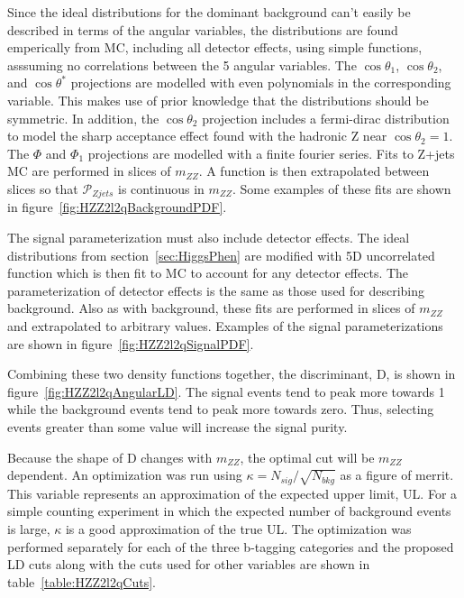 Since the ideal distributions for the dominant background 
can't easily be described in terms of the angular variables, 
the distributions are found 
emperically from MC, including all detector effects, 
using simple functions, asssuming no correlations between 
the 5 angular variables.  The $\cos\theta_1$, $\cos\theta_2$, 
and $\cos\theta^*$ projections are modelled with even polynomials
in the corresponding variable.  This makes use of prior knowledge
that the distributions should be symmetric.  In addition, 
the $\cos\theta_2$ projection includes a fermi-dirac distribution
to model the sharp acceptance effect found with the hadronic
Z near $\cos\theta_2=1$.  The $\Phi$ and $\Phi_1$ projections 
are modelled with a finite fourier series.
Fits to Z+jets MC are performed in slices of $m_{ZZ}$.  A function
is then extrapolated between slices so that $\mathscr{P}_{Zjets}$ 
is continuous in $m_{ZZ}$.  Some examples of these fits are shown
in figure~\ref{fig:HZZ2l2qBackgroundPDF}.  

The signal parameterization must also include detector effects.
The ideal distributions from section~\ref{sec:HiggsPhen} are 
modified with 5D uncorrelated function which is then fit to 
MC to account for any detector effects.  The parameterization 
of detector effects is the same as those used for describing background.
Also as with background, 
these fits are performed in slices of $m_{ZZ}$ and extrapolated
to arbitrary values.  Examples of the signal parameterizations
are shown in figure~\ref{fig:HZZ2l2qSignalPDF}.  

Combining these two density
functions together, the discriminant, D, is shown in
figure~\ref{fig:HZZ2l2qAngularLD}.  The signal events tend to peak more 
towards 1 while the background events tend to peak more towards
zero.  Thus, selecting events greater than some value will
increase the signal purity.  

Because the shape of D changes with $m_{ZZ}$, the optimal cut will 
be $m_{ZZ}$ dependent.
An optimization was run using $\kappa=N_{sig}/\sqrt{N_{bkg}}$ as a figure of 
merrit.  This variable represents an approximation of the expected 
upper limit, UL.  For a simple counting experiment in which the 
expected number of background events is large, $\kappa$ is a good
approximation of the true UL.  The optimization was performed 
separately for each of the three b-tagging categories and the
proposed LD cuts along with the cuts used for other variables
are shown in table~\ref{table:HZZ2l2qCuts}.

